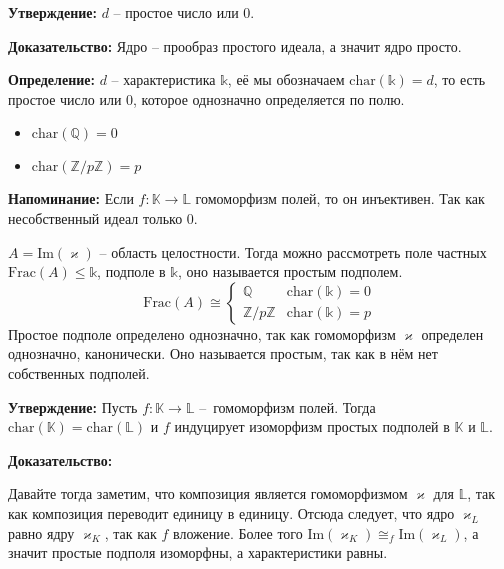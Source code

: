 \documentclass[a4paper, 12pt]{book}
\begin{document}
 \textbf{Утверждение:} $d$ – простое число или 0.

 \textbf{Доказательство:} Ядро – прообраз простого идеала, а значит ядро просто.

 \textbf{Определение:} $d$ – характеристика $\mathbb{k}$, её мы обозначаем
 $\text{char}(\mathbb{k})=d$, то есть простое число или 0, которое однозначно
 определяется по полю.

 \begin{itemize}
     \item $\text{char}(\mathbb{Q})=0$
     \item $\text{char}(\mathbb{Z}/p\mathbb{Z})=p$
 \end{itemize}

 \textbf{Напоминание:} Если $f:\mathbb{K}\rightarrow\mathbb{L}$ гомоморфизм
 полей, то он инъективен. Так как несобственный идеал только 0.

 $A=\text{Im}(\varkappa)$ – область целостности. Тогда можно рассмотреть поле
 частных $\text{Frac}(A)\leq\mathbb{k}$, подполе в $\mathbb{k}$, оно называется
 простым подполем.
 \[\text{Frac}(A)\cong \left\{\begin{array}{rcl}\mathbb{Q} & \text{char}(\mathbb{k})=0\\
                                                \mathbb{Z}/p\mathbb{Z} &\text{char}(\mathbb{k})=p
                              \end{array}\right.\]
Простое подполе определено однозначно, так как гомоморфизм $\varkappa$ определен
однозначно, канонически. Оно называется простым, так как в нём нет собственных
подполей.

\textbf{Утверждение:} Пусть $f:\mathbb{K}\rightarrow\mathbb{L}$ – гомоморфизм
полей. Тогда $\text{char}(\mathbb{K})=\text{char}(\mathbb{L})$ и $f$ индуцирует
изоморфизм простых подполей в $\mathbb{K}$ и $\mathbb{L}$.

\textbf{Доказательство:}
\begin{center}
\end{center}
Давайте тогда заметим, что композиция является гомоморфизмом $\varkappa$ для
$\mathbb{L}$, так как композиция переводит единицу в единицу. Отсюда следует,
что ядро $\varkappa_L$ равно ядру $\varkappa_K$, так как $f$ вложение. Более
того $\text{Im}(\varkappa_K)\cong_f\text{Im}(\varkappa_L)$, а значит простые
подполя изоморфны, а характеристики равны.
\end{document}
